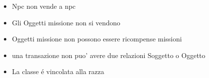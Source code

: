 
\begin{itemize}
\item Npc non vende a npc
\item Gli Oggetti missione non si vendono
\item Oggetti missione non possono essere ricompense missioni
\item una transazione non puo' avere due relazioni Soggetto o Oggetto
\item La classe \'{e} vincolata alla razza
\end{itemize}